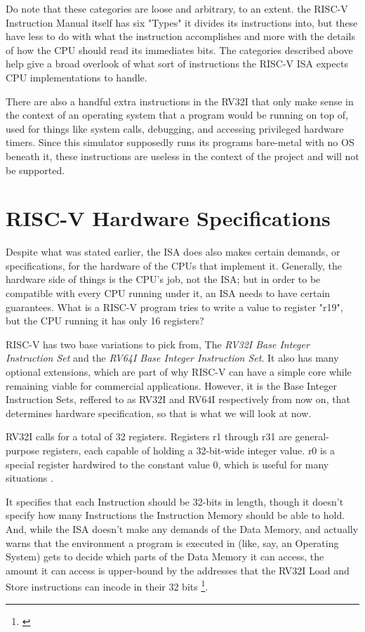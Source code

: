 \documentclass[12pt,twoside]{reedthesis}
\begin{document}
Do note that these categories are loose and arbitrary, to an extent. the RISC-V Instruction Manual itself has six "Types" it divides its instructions into, but these have less to do with what the instruction accomplishes and more with the details of how the CPU should read its immediates bits. The categories described above help give a broad overlook of what sort of instructions the RISC-V ISA expects CPU implementations to handle.

There are also a handful extra instructions in the RV32I that only make sense in the context of an operating system that a program would be running on top of, used for things like system calls, debugging, and accessing privileged hardware timers. Since this simulator supposedly runs its programs bare-metal with no OS beneath it, these instructions are useless in the context of the project and will not be supported.

\section{RISC-V Hardware Specifications}

Despite what was stated earlier, the ISA  does also makes certain demands, or specifications, for the hardware of the CPUs that implement it. Generally, the hardware side of things is the CPU's job, not the ISA; but in order to be compatible with every CPU running under it, an ISA needs to have certain guarantees. What is a RISC-V program tries to write a value to register "r19", but the CPU running it has only 16 registers?

RISC-V has two base variations to pick from, The \textit{RV32I Base Integer Instruction Set} and the \textit{RV64I Base Integer Instruction Set}. It also has many optional extensions, which are part of why RISC-V can have a simple core while remaining viable for commercial applications. However, it is the Base Integer Instruction Sets, reffered to as RV32I and RV64I respectively from now on, that determines hardware specification, so that is what we will look at now.

RV32I calls for a total of 32 registers. Registers r1 through r31 are general-purpose registers, each capable of holding a 32-bit-wide integer value. r0 is a special register hardwired to the constant value 0, which is useful for many situations .

It specifies that each Instruction should be 32-bits in length, though it doesn't specify how many Instructions the Instruction Memory should be able to hold. And, while the ISA doesn't make any demands of the Data Memory, and actually warns that the environment a program is executed in (like, say, an Operating System) gets to decide which parts of the Data Memory it can access, the amount it can access is upper-bound by the addresses that the RV32I Load and Store instructions can incode in their 32 bits \footnote{\cite{waterman}}.
\end{document}
